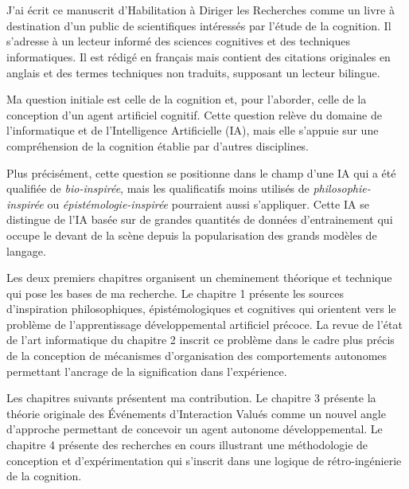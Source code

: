 \chapter*{}
\vspace{-1.5cm}
    \begin{minipage}[r]{.95\textwidth}\raggedleft
    \HUGE\bfseries\IntroductionName
    \end{minipage}
\vspace{2.5cm}


\noindent
J'ai écrit ce manuscrit d'Habilitation à Diriger les Recherches comme un livre à destination d'un public de scientifiques intéressés par l'étude de la cognition. 
Il s'adresse à un lecteur informé des sciences cognitives et des techniques informatiques.
Il est rédigé en français mais contient des citations originales en anglais et des termes techniques non traduits, supposant un lecteur bilingue.  

Ma question initiale est celle de la cognition et, pour l'aborder, celle de la conception d'un agent artificiel cognitif. 
Cette question relève du domaine de l'informatique et de l'Intelligence Artificielle (IA), mais elle s'appuie sur une compréhension de la cognition établie par d'autres disciplines.

Plus précisément, cette question se positionne dans le champ d'une IA qui a été qualifiée de \emph{bio-inspirée}, mais les qualificatifs moins utilisés de \emph{philosophie-inspirée} ou \emph{épistémologie-inspirée} pourraient aussi s'appliquer. 
Cette IA se distingue de l'IA basée sur de grandes quantités de données d'entrainement qui occupe le devant de la scène depuis la popularisation des grands modèles de langage.

Les deux premiers chapitres organisent un cheminement théorique et technique qui pose les bases de ma recherche.  
Le chapitre 1 présente les sources d'inspiration philosophiques, épistémologiques et cognitives qui orientent vers le problème de l'apprentissage développemental artificiel précoce.
La revue de l'état de l'art informatique du chapitre 2 inscrit ce problème dans le cadre plus précis de la conception de mécanismes d'organisation des comportements autonomes permettant l'ancrage de la signification dans l'expérience.

Les chapitres suivants présentent ma contribution. 
Le chapitre 3 présente la théorie originale des Événements d'Interaction Valués comme un nouvel angle d'approche permettant de concevoir un agent autonome développemental.
Le chapitre 4 présente des recherches en cours illustrant une méthodologie de conception et d'expérimentation qui s'inscrit dans une logique de rétro-ingénierie de la cognition. 




